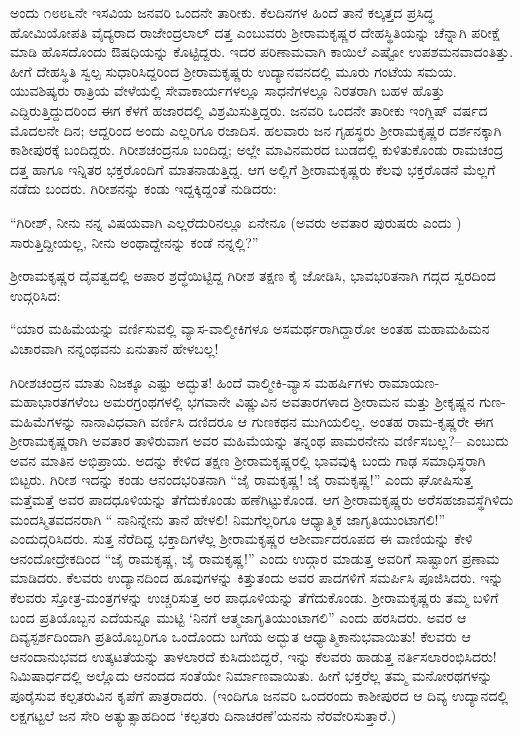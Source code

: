 ಅಂದು ೧೮೮೬ನೇ ಇಸವಿಯ ಜನವರಿ ಒಂದನೇ ತಾರೀಕು. ಕೆಲದಿನಗಳ ಹಿಂದೆ ತಾನೆ ಕಲ್ಕತ್ತದ ಪ್ರಸಿದ್ಧ ಹೋಮಿಯೋಪತಿ ವೈದ್ಯರಾದ ರಾಜೇಂದ್ರಲಾಲ್ ದತ್ತ ಎಂಬುವರು ಶ್ರೀರಾಮಕೃಷ್ಣರ ದೇಹಸ್ಥಿತಿಯನ್ನು ಚೆನ್ನಾಗಿ ಪರೀಕ್ಷೆ ಮಾಡಿ ಹೊಸದೊಂದು ಔಷಧಿಯನ್ನು ಕೊಟ್ಟಿದ್ದರು. ಇದರ ಪರಿಣಾಮವಾಗಿ ಕಾಯಿಲೆ ಎಷ್ಟೋ ಉಪಶಮನವಾದಂತಿತ್ತು. ಹೀಗೆ ದೇಹಸ್ಥಿತಿ ಸ್ವಲ್ಪ ಸುಧಾರಿಸಿದ್ದರಿಂದ ಶ್ರೀರಾಮಕೃಷ್ಣರು ಉದ್ಯಾನವನದಲ್ಲಿ ಮೂರು ಗಂಟೆಯ ಸಮಯ. ಯುವಶಿಷ್ಯರು ರಾತ್ರಿಯ ವೇಳೆಯಲ್ಲಿ ಸೇವಾಕಾರ್ಯಗಳಲ್ಲೂ ಸಾಧನೆಗಳಲ್ಲೂ ನಿರತರಾಗಿ ಬಹಳ ಹೊತ್ತು ಎದ್ದಿರುತ್ತಿದ್ದುದರಿಂದ ಈಗ ಕೆಳಗೆ ಹಜಾರದಲ್ಲಿ ವಿಶ್ರಮಿಸುತ್ತಿದ್ದರು. ಜನವರಿ ಒಂದನೇ ತಾರೀಕು ಇಂಗ್ಲಿಷ್ ವರ್ಷದ ಮೊದಲನೇ ದಿನ; ಆದ್ದರಿಂದ ಅಂದು ಎಲ್ಲರಿಗೂ ರಜಾದಿಸ. ಹಲವಾರು ಜನ ಗೃಹಸ್ಥರು ಶ್ರೀರಾಮಕೃಷ್ಣರ ದರ್ಶನಕ್ಕಾಗಿ ಕಾಶೀಪುರಕ್ಕೆ ಬಂದಿದ್ದರು. ಗಿರೀಶಚಂದ್ರನೂ ಬಂದಿದ್ದ; ಅಲ್ಲೇ ಮಾವಿನಮರದ ಬುಡದಲ್ಲಿ ಕುಳಿತುಕೊಂಡು ರಾಮಚಂದ್ರ ದತ್ತ ಹಾಗೂ ಇನ್ನಿತರ ಭಕ್ತರೊಂದಿಗೆ ಮಾತನಾಡುತ್ತಿದ್ದ. ಆಗ ಅಲ್ಲಿಗೆ ಶ್ರೀರಾಮಕೃಷ್ಣರು ಕೆಲವು ಭಕ್ತರೊಡನೆ ಮೆಲ್ಲಗೆ ನಡೆದು ಬಂದರು. ಗಿರೀಶನನ್ನು ಕಂಡು ಇದ್ದಕ್ಕಿದ್ದಂತೆ ನುಡಿದರು:

“ಗಿರೀಶ್, ನೀನು ನನ್ನ ವಿಷಯವಾಗಿ ಎಲ್ಲರೆದುರಿನಲ್ಲೂ ಏನೇನೂ (ಅವರು ಅವತಾರ ಪುರುಷರು ಎಂದು ) ಸಾರುತ್ತಿದ್ದೀಯಲ್ಲ, ನೀನು ಅಂಥಾದ್ದೇನನ್ನು ಕಂಡೆ ನನ್ನಲ್ಲಿ?”

ಶ್ರೀರಾಮಕೃಷ್ಣರ ದೈವತ್ವದಲ್ಲಿ ಅಪಾರ ಶ್ರದ್ಧೆಯಿಟ್ಟಿದ್ದ ಗಿರೀಶ ತಕ್ಷಣ ಕೈ ಜೋಡಿಸಿ, ಭಾವಭರಿತನಾಗಿ ಗದ್ಗದ ಸ್ವರದಿಂದ ಉದ್ಗರಿಸಿದ:

“ಯಾರ ಮಹಿಮೆಯನ್ನು ವರ್ಣಿಸುವಲ್ಲಿ ವ್ಯಾಸ-ವಾಲ್ಮೀಕಿಗಳೂ ಅಸಮರ್ಥರಾಗಿದ್ದಾರೋ ಅಂತಹ ಮಹಾಮಹಿಮನ ವಿಚಾರವಾಗಿ ನನ್ನಂಥವನು ಏನುತಾನೆ ಹೇಳಬಲ್ಲ!

ಗಿರೀಶಚಂದ್ರನ ಮಾತು ನಿಜಕ್ಕೂ ಎಷ್ಟು ಅದ್ಭುತ! ಹಿಂದೆ ವಾಲ್ಮೀಕಿ-ವ್ಯಾಸ ಮಹರ್ಷಿಗಳು ರಾಮಾಯಣ-ಮಹಾಭಾರತಗಳೆಂಬ ಅಮರಗ್ರಂಥಗಳಲ್ಲಿ ಭಗವಾನೇ ವಿಷ್ಣುವಿನ ಅವತಾರಗಳಾದ ಶ್ರೀರಾಮನ ಮತ್ತು ಶ್ರೀಕೃಷ್ಣನ ಗುಣ-ಮಹಿಮೆಗಳನ್ನು ನಾನಾವಿಧವಾಗಿ ವರ್ಣಿಸಿ ದಣಿದರೂ ಆ ಗುಣಕಥನ ಮುಗಿಯಲಿಲ್ಲ. ಅಂತಹ ರಾಮ-ಕೃಷ್ಣರೇ ಈಗ ಶ್ರೀರಾಮಕೃಷ್ಣರಾಗಿ ಅವತಾರ ತಾಳಿರುವಾಗ ಅವರ ಮಹಿಮೆಯನ್ನು ತನ್ನಂಥ ಪಾಮರನೇನು ವರ್ಣಿಸಬಲ್ಲ?– ಎಂಬುದು ಅವನ ಮಾತಿನ ಅಭಿಪ್ರಾಯ. ಅದನ್ನು ಕೇಳಿದ ತಕ್ಷಣ ಶ್ರೀರಾಮಕೃಷ್ಣರಲ್ಲಿ ಭಾವವುಕ್ಕಿ ಬಂದು ಗಾಢ ಸಮಾಧಿಸ್ಥರಾಗಿ ಬಿಟ್ಟರು. ಗಿರೀಶ ಇದನ್ನು ಕಂಡು ಆನಂದಭರಿತನಾಗಿ “ಜೈ ರಾಮಕೃಷ್ಣ! ಜೈ ರಾಮಕೃಷ್ಣ!” ಎಂದು ಘೋಷಿಸುತ್ತ ಮತ್ತೆಮತ್ತೆ ಅವರ ಪಾದಧೂಳಿಯನ್ನು ತೆಗೆದುಕೊಂಡು ಹಣೆಗಿಟ್ಟುಕೊಂಡ. ಆಗ ಶ್ರೀರಾಮಕೃಷ್ಣರು ಅರೆಸಹಜಾವಸ್ಥೆಗಿಳಿದು ಮಂದಸ್ಮಿತವದನರಾಗಿ “ ನಾನಿನ್ನೇನು ತಾನೆ ಹೇಳಲಿ! ನಿಮಗೆಲ್ಲರಿಗೂ ಆಧ್ಯಾತ್ಮಿಕ ಜಾಗೃತಿಯುಂಟಾಗಲಿ!” ಎಂದುದ್ಗರಿಸಿದರು. ಸುತ್ತ ನೆರೆದಿದ್ದ ಭಕ್ತಾದಿಗಳೆಲ್ಲ ಶ್ರೀರಾಮಕೃಷ್ಣರ ಆಶೀರ್ವಾದರೂಪದ ಈ ವಾಣಿಯನ್ನು ಕೇಳಿ ಆನಂದೋದ್ರೇಕದಿಂದ “ಜೈ ರಾಮಕೃಷ್ಣ, ಜೈ ರಾಮಕೃಷ್ಣ!” ಎಂದು ಉದ್ಗಾರ ಮಾಡುತ್ತ ಅವರಿಗೆ ಸಾಷ್ಟಾಂಗ ಪ್ರಣಾಮ ಮಾಡಿದರು. ಕೆಲವರು ಉದ್ಯಾನದಿಂದ ಹೂವುಗಳನ್ನು ಕಿತ್ತುತಂದು ಅವರ ಪಾದಗಳಿಗೆ ಸಮರ್ಪಿಸಿ ಪೂಜಿಸಿದರು. ಇನ್ನು ಕೆಲವರು ಸ್ತೋತ್ರ-ಮಂತ್ರಗಳನ್ನು ಉಚ್ಚರಿಸುತ್ತ ಅರ ಪಾಧೂಳಿಯನ್ನು ತೆಗೆದುಕೊಂಡು. ಶ್ರೀರಾಮಕೃಷ್ಣರು ತಮ್ಮ ಬಳಿಗೆ ಬಂದ ಪ್ರತಿಯೊಬ್ಬನ ಎದೆಯನ್ನೂ ಮುಟ್ಟಿ ‘ನಿನಗೆ ಆತ್ಮಜಾಗೃತಿಯುಂಟಾಗಲಿ” ಎಂದು ಹರಸಿದರು. ಅವರ ಆ ದಿವ್ಯಸ್ಪರ್ಶದಿಂದಾಗಿ ಪ್ರತಿಯೊಬ್ಬರಿಗೂ ಒಂದೊಂದು ಬಗೆಯ ಅದ್ಭುತ ಆಧ್ಯಾತ್ಮಿಕಾನುಭವಾಯಿತು! ಕೆಲವರು ಆ ಆನಂದಾನುಭವದ ಉತ್ಕಟತೆಯನ್ನು ತಾಳಲಾರದೆ ಕುಸಿದುಬಿದ್ದರೆ, ಇನ್ನು ಕೆಲವರು ಹಾಡುತ್ತ ನರ್ತಿಸಲಾರಂಭಿಸಿದರು! ನಿಮಿಷಾರ್ಧದಲ್ಲಿ ಅಲ್ಲೊದು ಆನಂದದ ಸಂತೆಯೇ ನಿರ್ಮಾಣವಾಯಿತು. ಹೀಗೆ ಭಕ್ತರೆಲ್ಲ ತಮ್ಮ ಮನೋರಥಗಳನ್ನು ಪೂರೈಸುವ ಕಲ್ಪತರುವಿನ ಕೃಪೆಗೆ ಪಾತ್ರರಾದರು. (ಇಂದಿಗೂ ಜನವರಿ ಒಂದರಂದು ಕಾಶೀಪುರದ ಆ ದಿವ್ಯ ಉದ್ಯಾನದಲ್ಲಿ ಲಕ್ಷಗಟ್ಟಲೆ ಜನ ಸೇರಿ ಅತ್ಯುತ್ಸಾಹದಿಂದ ‘ಕಲ್ಪತರು ದಿನಾಚರಣೆ’ಯನನು ನೆರವೇರಿಸುತ್ತಾರೆ.)

